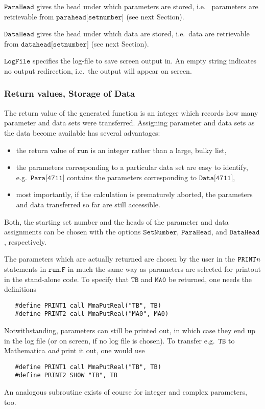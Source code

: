\documentclass[twoside,11pt]{article}
\def\Var#1{\ensuremath{\mathit{#1}}}
\def\Vn{\Var{n}}
\def\Code#1{\ensuremath{\texttt{#1}}}
\def\ie{i.e.\ }
\def\eg{e.g.\ }
\begin{document}
\Code{ParaHead} gives the head under which parameters are stored, \ie 
parameters are retrievable from \Code{parahead[setnumber]} (see next
Section).

\Code{DataHead} gives the head under which data are stored, \ie data are
retrievable from \Code{datahead[setnumber]} (see next Section).

\Code{LogFile} specifies the log-file to save screen output in.  An
empty string indicates no output redirection, \ie the output will appear 
on screen.


\subsubsection{Return values, Storage of Data}

The return value of the generated function is an integer which records 
how many parameter and data sets were transferred.  Assigning parameter 
and data sets as the data become available has several advantages:
\begin{itemize}
\item
the return value of \Code{run} is an integer rather than a large, 
bulky list,

\item 
the parameters corresponding to a particular data set are easy to
identify, \eg \Code{Para[4711]} contains the parameters corresponding
to \Code{Data[4711]},

\item 
most importantly, if the calculation is prematurely aborted, the 
parameters and data transferred so far are still accessible.
\end{itemize}
Both, the starting set number and the heads of the parameter and data 
assignments can be chosen with the options \Code{SetNumber}, 
\Code{ParaHead}, and \Code{DataHead}, respectively.

The parameters which are actually returned are chosen by the user in the
\Code{PRINT\Vn} statements in \Code{run.F} in much the same way 
as parameters are selected for printout in the stand-alone code.  To 
specify that \Code{TB} and \Code{MA0} be returned, one needs the 
definitions
\begin{verbatim}
   #define PRINT1 call MmaPutReal("TB", TB)
   #define PRINT2 call MmaPutReal("MA0", MA0)
\end{verbatim}
Notwithstanding, parameters can still be printed out, in which case 
they end up in the log file (or on screen, if no log file is chosen).  
To transfer \eg \Code{TB} to Mathematica \emph{and} print it out, one 
would use
\begin{verbatim}
   #define PRINT1 call MmaPutReal("TB", TB)
   #define PRINT2 SHOW "TB", TB
\end{verbatim}
An analogous subroutine exists of course for integer and complex
parameters, too.
\end{document}
